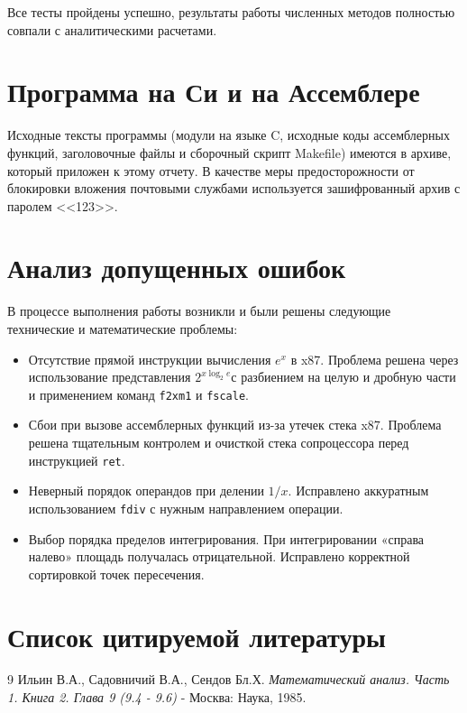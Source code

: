 \documentclass[a4paper,12pt,titlepage,final]{article}
\begin{document}
Все тесты пройдены успешно, результаты работы численных методов полностью совпали с аналитическими расчетами.

\newpage

\section{Программа на Си и на Ассемблере}
Исходные тексты программы (модули на языке C, исходные коды ассемблерных функций,
заголовочные файлы и сборочный скрипт Makefile) имеются в архиве, который приложен к этому отчету.
В качестве меры предосторожности от блокировки вложения почтовыми службами используется зашифрованный архив с паролем <<123>>.

\newpage

\section{Анализ допущенных ошибок}
В процессе выполнения работы возникли и были решены следующие технические и математические проблемы:
\begin{itemize}
\item Отсутствие прямой инструкции вычисления $e^x$ в x87. Проблема решена через использование представления $2^{x \log_2 e}$с разбиением на целую и дробную части и применением команд \texttt{f2xm1} и \texttt{fscale}.
\item Сбои при вызове ассемблерных функций из-за утечек стека x87. Проблема решена тщательным контролем и очисткой стека сопроцессора перед инструкцией \texttt{ret}.
\item Неверный порядок операндов при делении $1/x$. Исправлено аккуратным использованием \texttt{fdiv} с нужным направлением операции.
\item Выбор порядка пределов интегрирования. При интегрировании «справа налево» площадь получалась отрицательной. Исправлено корректной сортировкой точек пересечения.
\end{itemize}

\newpage

\section{Список цитируемой литературы}
\begin{thebibliography}{9}
Ильин В.А., Садовничий В.А., Сендов Бл.Х. \textit{Математический анализ. Часть 1. Книга 2. Глава 9 (9.4 - 9.6)} - Москва: Наука, 1985.
\end{thebibliography}
\end{document}
